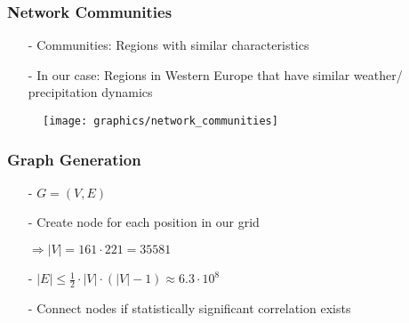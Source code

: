 \documentclass[xcolor=dvipsnames, aspectratio=169]{beamer}
\begin{document}
    
    \begin{comment}
        \item Intuition for communities
        \item graph generation 
        \item 
    \end{comment}   
    \begin{frame}
        \frametitle{Network Communities}
        \begin{minipage}{.45\paperwidth}
            \begin{itemize}
                \item[-] Communities: Regions with similar characteristics 
                \item[-] In our case: Regions in Western Europe that have similar weather/ precipitation dynamics
            \end{itemize}
        \end{minipage}
        \hspace{.1cm}
        \begin{minipage}{.45\paperwidth}
            \begin{figure}
                \centering
                \texttt{[image: graphics/network\_communities]}
            \end{figure}
        \end{minipage}
    \end{frame}
    
    \begin{comment}
            -nodes(downsampling)
            -edges(correlation and autocorrelation)
    \end{comment}
    \begin{frame}
        \frametitle{Graph Generation}
        \begin{itemize}
            \item[-] $G=(V,E)$ \pause
            \item[-] Create node for each position in our grid
            \item[] $\Rightarrow |V| = 161 \cdot 221 = 35581$ \pause
            \item[-] $|E| \leq \frac{1}{2} \cdot |V| \cdot (|V|-1) \approx 6.3 \cdot 10^8$ \pause
            \item[-] Connect nodes if statistically significant correlation exists
        \end{itemize}
        
    \end{frame}
    
\end{document}
